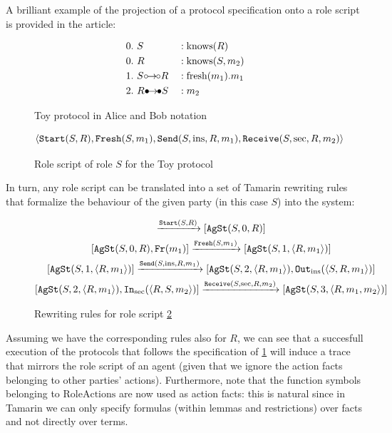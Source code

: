 \documentclass{article}
\def\ins{\hbox{$\circ$}\kern-1.5pt\hbox{$\to$}\kern -1pt\hbox{$\circ$}}
\def\sec{\hbox{$\bullet$}\kern-1.5pt\hbox{$\to$}\kern -1pt\hbox{$\bullet$}}
\newcommand{\mono}[1]{\textrm{\tt #1}}
\begin{document}
A brilliant example of the projection of a protocol specification onto a role script is provided in the article:

\begin{figure}
\begin{alignat*}{3}
    &0.\  S &&: \textrm{knows}(R)\\
    &0.\  R &&: \textrm{knows}(S, m_2)\\
    &1.\  S \ins R &&: \textrm{fresh}(m_1).m_1\\
    &2.\  R \sec S &&: m_2
\end{alignat*}
\caption{Toy protocol in Alice and Bob notation}
\label{eq:toy_protocol}
\end{figure}

\begin{figure}
\begin{equation*}
    \langle \mono{Start}(S,R), \mono{Fresh}(S, m_1), \mono{Send}(S, \textrm{ins}, R, m_1), \mono{Receive}(S, \textrm{sec}, R, m_2) \rangle
\end{equation*}
\caption{Role script of role $S$ for the Toy protocol}
\label{eq:role_script}
\end{figure}

In turn, any role script can be translated into a set of Tamarin rewriting rules that formalize the behaviour of the given party (in this case $S$) into the system:

\begin{figure}
\begin{gather*}
    [ \ ] \xrightarrow{\mono{Start}(S,R)} [\mono{AgSt}(S,0,R)]\\
    [\mono{AgSt}(S,0,R), \mono{Fr}(m_1)] \xrightarrow{\mono{Fresh}(S,m_1)} [\mono{AgSt}(S,1,\langle R,m_1 \rangle)]\\
    [\mono{AgSt}(S,1,\langle R,m_1 \rangle)] \xrightarrow{\mono{Send}(S,\textrm{ins},R,m_1)} [\mono{AgSt}(S,2,\langle R,m_1 \rangle), \mono{Out}_\textrm{ins}(\langle S, R, m_1 \rangle)]\\
    [\mono{AgSt}(S,2,\langle R,m_1 \rangle), \mono{In}_\textrm{sec}(\langle R, S, m_2 \rangle)] \xrightarrow{\mono{Receive}(S, \textrm{sec}, R, m_2)} [\mono{AgSt}(S,3,\langle R, m_1, m_2 \rangle)]
\end{gather*}
\caption{Rewriting rules for role script \ref{eq:role_script}}
\end{figure}
Assuming we have the corresponding rules also for $R$, we can see that a succesfull execution of the protocols that follows the specification of \ref{eq:toy_protocol} will induce a trace that mirrors the role script of an agent (given that we ignore the action facts belonging to other parties' actions). Furthermore, note that the function symbols belonging to $\textrm{RoleActions}$ are now used as action facts: this is natural since in Tamarin we can only specify formulas (within lemmas and restrictions) over facts and not directly over terms.
\end{document}

